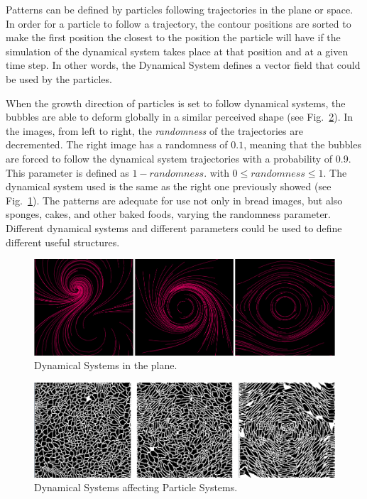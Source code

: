 \documentclass[oneside,a4paper,english,links]{amca}
\begin{document}
Patterns can be defined by particles following trajectories in the plane or space. In order for a particle to follow a trajectory, the contour positions are sorted to make the first position the closest to the position the particle will have if the simulation of the dynamical system takes place at that position and at a given time step. In other words, the Dynamical System defines a vector field that could be used by the particles.

When the growth direction of particles is set to follow dynamical systems, the bubbles are able to deform globally in a similar perceived shape (see Fig.~\ref{fg:fig4}). In the images, from left to right, the {\em randomness} of the trajectories are decremented. The right image has a randomness of $0.1$, meaning that the bubbles are forced to follow the dynamical system trajectories with a probability of 0.9. This parameter is defined as $1-randomness$. with $0 \leq randomness \leq 1$. The dynamical system used is the same as the right one previously showed (see Fig.~\ref{fg:fig3}).
The patterns are adequate for use not only in bread images, but also sponges, cakes, and other baked foods, varying the randomness parameter. Different dynamical systems and different parameters could be used to define different useful structures.

\begin{figure}[htb!]
  \centerline{\includegraphics[scale=0.28]{fig3}}
  \caption{Dynamical Systems in the plane.}
  \label{fg:fig3}
\end{figure}


\begin{figure}[htb!]
  \centerline{\includegraphics[scale=0.21]{fig4}}
  \caption{Dynamical Systems affecting Particle Systems.}
  \label{fg:fig4}
\end{figure}
\end{document}
